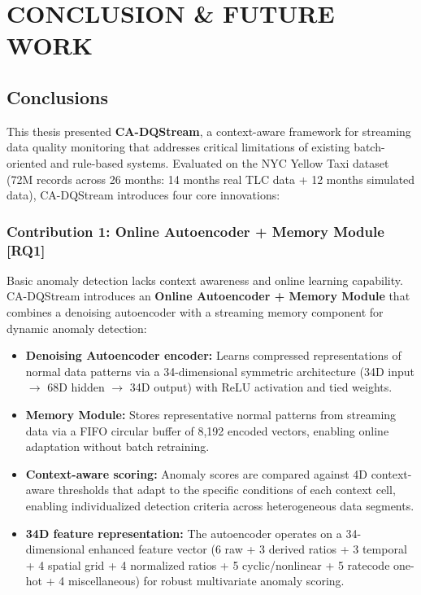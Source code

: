 \newpage
\chapter{CONCLUSION \& FUTURE WORK}
\pagestyle{fancy}

\section{Conclusions}

This thesis presented \textbf{CA-DQStream}, a context-aware framework for streaming data quality monitoring that addresses critical limitations of existing batch-oriented and rule-based systems. Evaluated on the NYC Yellow Taxi dataset (72M records across 26 months: 14 months real TLC data + 12 months simulated data), CA-DQStream introduces four core innovations:

\subsection{Contribution 1: Online Autoencoder + Memory Module [RQ1]}

Basic anomaly detection lacks context awareness and online learning capability. CA-DQStream introduces an \textbf{Online Autoencoder + Memory Module} that combines a denoising autoencoder with a streaming memory component for dynamic anomaly detection:

\begin{itemize}
    \item \textbf{Denoising Autoencoder encoder:} Learns compressed representations of normal data patterns via a 34-dimensional symmetric architecture (34D input $\rightarrow$ 68D hidden $\rightarrow$ 34D output) with ReLU activation and tied weights.
    \item \textbf{Memory Module:} Stores representative normal patterns from streaming data via a FIFO circular buffer of 8,192 encoded vectors, enabling online adaptation without batch retraining.
    \item \textbf{Context-aware scoring:} Anomaly scores are compared against 4D context-aware thresholds that adapt to the specific conditions of each context cell, enabling individualized detection criteria across heterogeneous data segments.
    \item \textbf{34D feature representation:} The autoencoder operates on a 34-dimensional enhanced feature vector (6 raw + 3 derived ratios + 3 temporal + 4 spatial grid + 4 normalized ratios + 5 cyclic/nonlinear + 5 ratecode one-hot + 4 miscellaneous) for robust multivariate anomaly scoring.
\end{itemize}

